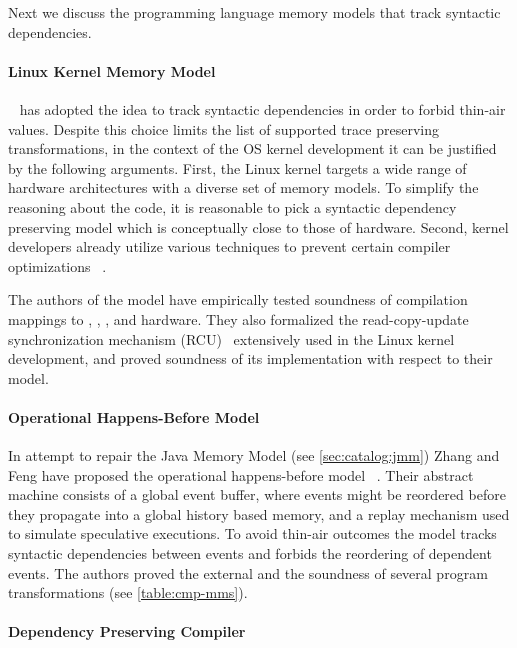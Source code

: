 Next we discuss the programming language memory models 
that track syntactic dependencies.

\paragraph{Linux Kernel Memory Model}

\LKMM~\cite{Alglave-al:ASPLOS18} has adopted 
the idea to track syntactic dependencies in order to 
forbid thin-air values. Despite this choice 
limits the list of supported trace preserving transformations,
in the context of the OS kernel development 
it can be justified by the following arguments. 
First, the Linux kernel targets 
a wide range of hardware architectures with a diverse
set of memory models. To simplify the reasoning about the code, 
it is reasonable to pick a syntactic dependency preserving
model which is conceptually close to those of hardware. 
Second, kernel developers already utilize 
various techniques to prevent certain compiler optimizations~%
\cite{Alglave-al:ASPLOS18, LK-MemBarriers, LK-RCU-Deref}.

The authors of the model have empirically tested 
soundness of compilation mappings to 
\Intel, , , and \POWER hardware. 
They also formalized the read-copy-update 
synchronization mechanism (RCU)~\cite{McKenney-RCU2007} 
extensively used in the Linux kernel development, 
and proved soundness of its implementation with respect to their model.

\paragraph{Operational Happens-Before Model}

In attempt to repair the Java Memory Model (see \cref{sec:catalog:jmm})
Zhang and Feng have proposed the 
operational happens-before model \OHMM~\cite{Zhang-Feng:FCS16}.
Their abstract machine consists of a global event buffer,
where events might be reordered before they propagate into  
a global history based memory, and a replay mechanism 
used to simulate speculative executions. 
To avoid thin-air outcomes the model tracks syntactic dependencies 
between events and forbids the reordering of dependent events. 
The authors proved the external \DRF and 
the soundness of several program transformations
(see \cref{table:cmp-mms}). 

\paragraph{Dependency Preserving Compiler}

